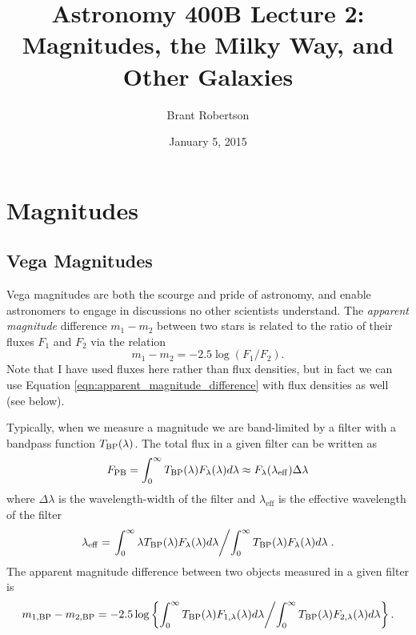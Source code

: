 \documentclass[12pt]{article}
\title{Astronomy 400B Lecture 2: Magnitudes, the Milky Way, and Other Galaxies}
\author{Brant Robertson}
\date{January 5, 2015}
\begin{document}
\maketitle

\section{Magnitudes}
\subsection{Vega Magnitudes}

Vega magnitudes are both the scourge and pride of astronomy, and enable astronomers to
engage in discussions no other scientists understand. The
{\it apparent magnitude}
difference $m_1 - m_2$ 
between two stars is related to the ratio of their fluxes
$F_1$ and $F_2$ 
via the relation
\begin{equation}
\label{eqn:apparent_magnitude_difference}
m_{1} - m_{2} = -2.5 \log (F_1 / F_2).
\end{equation}
\noindent
Note that I have used fluxes here rather than flux densities,
but in fact we can use Equation \ref{eqn:apparent_magnitude_difference}
with flux densities as well (see below).

Typically, when we measure a magnitude we are band-limited by a
filter with a bandpass function $T_{\mathrm{BP}}(\lambda)$. The total flux in
a given filter can be written as
\begin{equation}
F_{\mathrm{PB}} = \int_{0}^{\infty} T_{\mathrm{BP}}(\lambda)F_{\lambda}(\lambda)d\lambda \approx F_{\lambda}(\lambda_{\mathrm{eff}})\Delta\lambda
\end{equation}
\noindent
where $\Delta \lambda$
is the wavelength-width of the filter and $\lambda_{\mathrm{eff}}$ is the effective wavelength of the filter 
\begin{equation}
\lambda_{\mathrm{eff}} = \left. \int_{0}^{\infty} \lambda T_{\mathrm{BP}}(\lambda) F_{\lambda}(\lambda) d\lambda \middle/ \int_{0}^{\infty} T_{\mathrm{BP}}(\lambda) F_{\lambda}(\lambda) d\lambda \right. .
\end{equation} 
\noindent
The apparent magnitude difference between two objects measured in a given filter is
\begin{equation}
m_{1,\mathrm{BP}} - m_{2,\mathrm{BP}} = -2.5 \log \left\{ \int_{0}^{\infty} T_{\mathrm{BP}}(\lambda) F_{1,\lambda}(\lambda) d \lambda \middle/ \int_{0}^{\infty} T_{\mathrm{BP}}(\lambda) F_{2,\lambda}(\lambda) d \lambda \right\}.
\end{equation}
\end{document}

